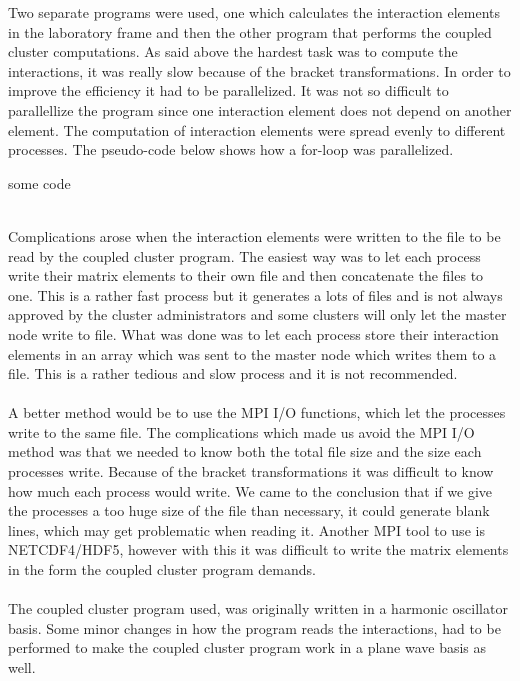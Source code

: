 Two separate programs were used, one which calculates the interaction elements in
the laboratory frame and then the other program that performs the coupled cluster
computations. As said above the hardest task was to compute the interactions,
it was really slow because of the bracket transformations.  In order to improve
the efficiency it had to be parallelized. It was not so difficult to parallellize the program since one interaction element does not depend on another element. 
The computation of interaction elements were 
spread evenly to different processes.  
The pseudo-code below shows how a for-loop was parallelized.
\begin{algorithm}
\begin{algorithmic}
         \STATE   some code
        \ENDFOR
\end{algorithmic}
\end{algorithm}\\
Complications
arose when the interaction elements were written to the file to be read by the coupled cluster
program.  The easiest way was to let each process write their matrix elements
to their own file and then concatenate the files to one. This is a rather fast
process but it generates a lots of files and is not always approved by the
cluster administrators and some clusters will only let the master node write to
file.  What was done was to let each process store their interaction elements in
an array which was sent to the master node which writes them to a file. This
is a rather tedious and slow process and it is not recommended.\\
\\
A better method
would be to use the MPI I/O functions, which let the processes write to the
same file. The complications which made us avoid the MPI I/O method was that we
needed to know both the total file size and the size each processes write.
Because of the bracket transformations it was difficult to 
know how much each process would
write. We came to the conclusion that if we give the processes a too huge size
of the file than necessary, it could generate blank lines, which may get problematic when reading it. Another MPI tool to use is NETCDF4/HDF5, however with this it was difficult to write the matrix elements in the form the coupled cluster
program demands.\\
\\
The coupled cluster program used, was originally written in a harmonic oscillator basis. 
Some minor changes in how the program reads the interactions, had to be performed to make the coupled cluster program work in a plane wave basis as well. 
